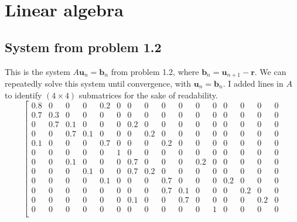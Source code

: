 \documentclass[letterpaper, 10pt]{article}
\begin{document}
\clearpage
\appendix
\section{Linear algebra}
\subsection{System from problem 1.2}
\label{ssec:matrix}
This is the system $A\mathbf{u}_n = \mathbf{b}_n$ from problem 1.2, where $\mathbf{b}_{n} = \mathbf{u}_{n+1} - \mathbf{r}$. We can repeatedly solve this system until convergence, with $\mathbf{u}_n = \mathbf{b}_{n}$. I added lines in $A$ to identify $(4 \times 4)$ submatrices for the sake of readability. 
\[
\left[
\begin{array}{cccc|cccc|cccc|cccc}
0.8 & 0    & 0   & 0   & 0.2 & 0   & 0   & 0   & 0   & 0   & 0   & 0   & 0   & 0   & 0   & 0   \\ %
0.7 & 0.3  & 0   & 0   & 0   & 0   & 0   & 0   & 0   & 0   & 0   & 0   & 0   & 0   & 0   & 0   \\ %
0   & 0.7  & 0.1 & 0   & 0   & 0   & 0.2 & 0   & 0   & 0   & 0   & 0   & 0   & 0   & 0   & 0   \\ %
0   & 0    & 0.7 & 0.1 & 0   & 0   & 0   & 0.2 & 0   & 0   & 0   & 0   & 0   & 0   & 0   & 0   \\ %
\hline
0.1 & 0    & 0   & 0   & 0.7 & 0   & 0   & 0   & 0.2 & 0   & 0   & 0   & 0   & 0   & 0   & 0   \\ %
0   & 0    & 0   & 0   & 0   & 1   & 0   & 0   & 0   & 0   & 0   & 0   & 0   & 0   & 0   & 0   \\ %
0   & 0    & 0.1 & 0   & 0   & 0   & 0.7 & 0   & 0   & 0   & 0.2 & 0   & 0   & 0   & 0   & 0   \\ %
0   & 0    & 0   & 0.1 & 0   & 0   & 0.7 & 0.2 & 0   & 0   & 0   & 0   & 0   & 0   & 0   & 0   \\ %
\hline
0   & 0    & 0   & 0   & 0.1 & 0   & 0   & 0   & 0.7 & 0   & 0   & 0   & 0.2 & 0   & 0   & 0   \\ %
0   & 0    & 0   & 0   & 0   & 0   & 0   & 0   & 0.7 & 0.1 & 0   & 0   & 0   & 0.2 & 0   & 0   \\ %
0   & 0    & 0   & 0   & 0   & 0   & 0.1 & 0   & 0   & 0.7 & 0   & 0   & 0   & 0   & 0.2 & 0   \\ %
0   & 0    & 0   & 0   & 0   & 0   & 0   & 0   & 0   & 0   & 0   & 1   & 0   & 0   & 0   & 0   \\ %

\end{array}\]
\end{document}
